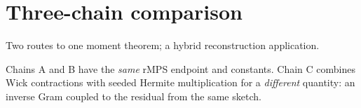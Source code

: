 \documentclass[11pt]{article}
\numberwithin{equation}{section}
\theoremstyle{definition}\newtheorem{definition}[theorem]{Definition}
\theoremstyle{remark}\newtheorem{remark}[theorem]{Remark}
\begin{document}
\section*{Three-chain comparison}
\label{sec:three-chain-overview}
{\sffamily\color{Teal}\large Two routes to one moment theorem; a hybrid reconstruction application.\par}
\vspace{2mm}
Chains A and B have the \emph{same} rMPS endpoint and constants. Chain C combines
Wick contractions with seeded Hermite multiplication for a \emph{different}
quantity: an inverse Gram coupled to the residual from the same sketch.

\vspace{2mm}
\begingroup
\fontsize{9.5}{11.7}\selectfont
\setlength{\tabcolsep}{4pt}
\renewcommand{\arraystretch}{1.12}
\end{document}

